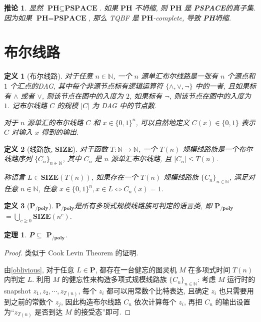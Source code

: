 \documentclass[8pt]{article}
\theoremstyle{compact}
\newtheorem{theorem}{定理}[section]
\newtheorem{definition}{定义}[section]
\newtheorem{corollary}{推论}[section]
\def\le{\leqslant}
\def\ge{\geqslant}
\def\P{\textbf{P}}
\def\PSPACE{\textbf{PSPACE}}
\def\PH{\textbf{PH}}
\def\SIZE{\textbf{SIZE}}
\def\PPOLY{$\textbf{P}_{\textbf{/poly}}$}
\begin{document}
\begin{corollary}
	显然 $\PH \subseteq \PSPACE$. 如果 $\PH$ 不坍缩, 则 $\PH$ 是 \PSPACE 的真子集. 因为如果 $\PH = \PSPACE$, 那么 \textsf{TQBF} 是 $\PH$-complete, 导致 \PH 坍缩.
\end{corollary}

\section{布尔线路}
\begin{definition}[布尔线路]
	对于任意 $n \in \mathbb N$, 一个 $n$ 源单汇布尔线路是一张有 $n$ 个源点和 $1$ 个汇点的DAG, 其中每个非源节点标有逻辑运算符 $\{\wedge, \vee, \lnot\}$ 中的一者, 且如果标有 $\wedge$ 或者 $\vee$, 则该节点在图中的入度为 $2$, 如果标有 $\lnot$, 则该节点在图中的入度为 $1$. 记布尔线路 $C$ 的规模 $|C|$ 为 DAG 中的节点数.

	对于 $n$ 源单汇的布尔线路 $C$ 和 $x \in \{0, 1\}^n$, 可以自然地定义 $C(x) \in \{0, 1\}$ 表示 $C$ 对输入 $x$ 得到的输出. 
\end{definition}
\begin{definition}[线路族, \SIZE]
	对于函数 $T : \mathbb N \to \mathbb N$, 一个 $T(n)$ 规模线路族是一个布尔线路序列 $\{C_n\}_{n \in \mathbb N}$, 其中 $C_n$ 是 $n$ 源单汇布尔线路, 且 $|C_n| \le T(n)$.

	称语言 $L \in \SIZE(T(n))$, 如果存在一个 $T(n)$ 规模线路族 $\{C_n\}_{n \in \mathbb N}$, 满足对任意 $n \in \mathbb N$, 任意 $x \in \{0, 1\}^n, x \in L \Leftrightarrow C_n(x) = 1$.
\end{definition}
\begin{definition}[\PPOLY]
	\PPOLY 是所有多项式规模线路族可判定的语言类, 即 \PPOLY $ = \bigcup_{c \ge 0} \SIZE(n^c)$.
\end{definition}
\begin{theorem}
	\P $\subseteq$ \PPOLY.
	\label{P_subset_PPOLY}
\end{theorem}
\begin{proof}
	类似于 Cook Levin Theorem 的证明.

	由\cref{oblivious}, 对于任意 $L \in \P$, 都存在一台健忘的图灵机 $M$ 在多项式时间 $T(n)$ 内判定 $L$. 利用 $M$ 的健忘性来构造多项式规模线路族 $\{C_n\}_{n \in \mathbb N}$: 考虑 $M$ 运行时的 snapshot $z_1, z_2, \cdots, z_{T(n)}$, 每个 $z_i$ 都可以用常数个比特表达, 且确定 $z_i$ 也只需要用到之前的常数个 $z_j$, 因此构造布尔线路 $C_n$ 依次计算每个 $z_i$, 再把 $C_n$ 的输出设置为“$z_{T(n)}$ 是否到达 $M$ 的接受态”即可.
\end{proof}
\end{document}
